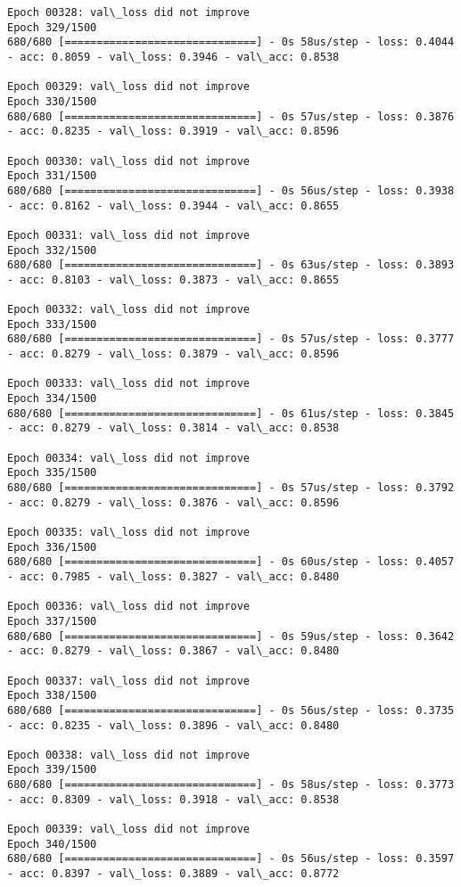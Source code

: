 \documentclass[11pt]{article}
\begin{document}
\begin{Verbatim}[commandchars=\\\{\}]
Epoch 00328: val\_loss did not improve
Epoch 329/1500
680/680 [==============================] - 0s 58us/step - loss: 0.4044 - acc: 0.8059 - val\_loss: 0.3946 - val\_acc: 0.8538

Epoch 00329: val\_loss did not improve
Epoch 330/1500
680/680 [==============================] - 0s 57us/step - loss: 0.3876 - acc: 0.8235 - val\_loss: 0.3919 - val\_acc: 0.8596

Epoch 00330: val\_loss did not improve
Epoch 331/1500
680/680 [==============================] - 0s 56us/step - loss: 0.3938 - acc: 0.8162 - val\_loss: 0.3944 - val\_acc: 0.8655

Epoch 00331: val\_loss did not improve
Epoch 332/1500
680/680 [==============================] - 0s 63us/step - loss: 0.3893 - acc: 0.8103 - val\_loss: 0.3873 - val\_acc: 0.8655

Epoch 00332: val\_loss did not improve
Epoch 333/1500
680/680 [==============================] - 0s 57us/step - loss: 0.3777 - acc: 0.8279 - val\_loss: 0.3879 - val\_acc: 0.8596

Epoch 00333: val\_loss did not improve
Epoch 334/1500
680/680 [==============================] - 0s 61us/step - loss: 0.3845 - acc: 0.8279 - val\_loss: 0.3814 - val\_acc: 0.8538

Epoch 00334: val\_loss did not improve
Epoch 335/1500
680/680 [==============================] - 0s 57us/step - loss: 0.3792 - acc: 0.8279 - val\_loss: 0.3876 - val\_acc: 0.8596

Epoch 00335: val\_loss did not improve
Epoch 336/1500
680/680 [==============================] - 0s 60us/step - loss: 0.4057 - acc: 0.7985 - val\_loss: 0.3827 - val\_acc: 0.8480

Epoch 00336: val\_loss did not improve
Epoch 337/1500
680/680 [==============================] - 0s 59us/step - loss: 0.3642 - acc: 0.8279 - val\_loss: 0.3867 - val\_acc: 0.8480

Epoch 00337: val\_loss did not improve
Epoch 338/1500
680/680 [==============================] - 0s 56us/step - loss: 0.3735 - acc: 0.8235 - val\_loss: 0.3896 - val\_acc: 0.8480

Epoch 00338: val\_loss did not improve
Epoch 339/1500
680/680 [==============================] - 0s 58us/step - loss: 0.3773 - acc: 0.8309 - val\_loss: 0.3918 - val\_acc: 0.8538

Epoch 00339: val\_loss did not improve
Epoch 340/1500
680/680 [==============================] - 0s 56us/step - loss: 0.3597 - acc: 0.8397 - val\_loss: 0.3889 - val\_acc: 0.8772


\end{Verbatim}
\end{document}
